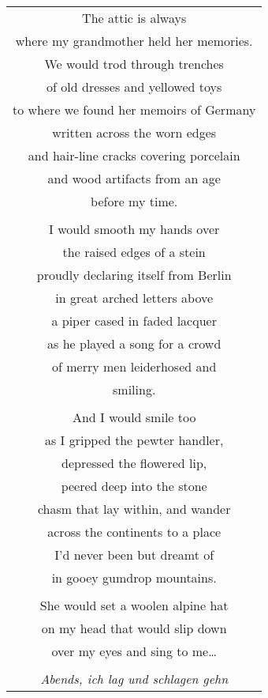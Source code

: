 \documentclass{article}
\begin{document}
\begin{center}
\begin{tabular}{c}
\\
The attic is always \\
where my grandmother held her memories. \\
We would trod through trenches \\
of old dresses and yellowed toys \\
to where we found her memoirs of Germany \\
written across the worn edges \\
and hair-line cracks covering porcelain \\
and wood artifacts from an age \\
before my time. \\
\\
I would smooth my hands over \\
the raised edges of a stein \\
proudly declaring itself from Berlin \\
in great arched letters above \\
a piper cased in faded lacquer \\
as he played a song for a crowd \\
of merry men leiderhosed and \\
smiling. \\
\\
And I would smile too \\
as I gripped the pewter handler, \\
depressed the flowered lip, \\
peered deep into the stone \\
chasm that lay within, and wander \\
across the continents to a place \\
I'd never been but dreamt of \\
in gooey gumdrop mountains. \\
\\
She would set a woolen alpine hat \\
on my head that would slip down \\
over my eyes and sing to me\ldots{} \\
\\
\textit{Abends, ich lag und schlagen gehn} \\

\end{tabular}
\end{center}
\end{document}
